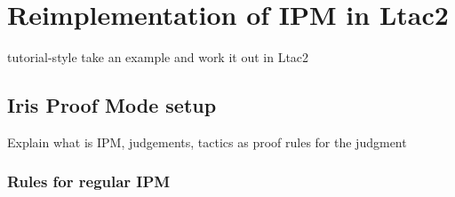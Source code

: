 
\chapter{Reimplementation of IPM in Ltac2}
\label{chap:reimplementation_ipm}



tutorial-style
take an example and work it out in Ltac2

\section{Iris Proof Mode setup}
\label{sec:ipm_general}


Explain what is IPM, judgements, tactics as proof rules for the judgment


\subsection{Rules for regular IPM}



